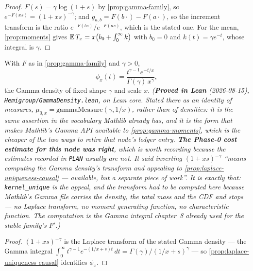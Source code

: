 \begin{proof}
\leanok
$F(s) = \gamma\log(1+s)$ by \ref{prop:gamma-family}, so $e^{-F(xs)} = (1+xs)^{-\gamma}$; and
$g_{a,b} = F(b\cdot) - F(a\cdot)$, so the increment transform is the ratio
$e^{-F(bs)}/e^{-F(as)}$, which is the stated one. For the mean, \ref{prop:moments} gives
$\mathbb{E}\,T_x = x\bigl(b_0 + \int_0^\infty k\bigr)$ with $b_0 = 0$ and $k(t) = \gamma e^{-t}$, whose
integral is $\gamma$.
\end{proof}

\begin{proposition}\label{prop:gamma-density}
\leanok
With $F$ as in \ref{prop:gamma-family} and $\gamma > 0$,
\[
  \phi_x(t) = \frac{t^{\gamma - 1} e^{-t/x}}{\Gamma(\gamma)\, x^{\gamma}},
\]
the Gamma density of fixed shape $\gamma$ and scale $x$.
\statusT\quad\emph{(\textbf{Proved in Lean} (2026-08-15), \texttt{Hemigroup/GammaDensity.lean}, on
Lean core. Stated there as an identity of \emph{measures}, $\mu_{0,x} = \mathrm{gammaMeasure}(\gamma, 1/x)$,
rather than of densities: it is the same assertion in the vocabulary Mathlib already has, and it
is the form that makes Mathlib's Gamma API available to \ref{prop:gamma-moments}, which is the
cheaper of the two ways to retire that node's ledger entry.
\textbf{The Phase-0 cost estimate for this node was right}, which is worth recording because the
estimates recorded in \texttt{PLAN} usually are not. It said inverting $(1+xs)^{-\gamma}$ ``means
computing the Gamma density's transform and appealing to \ref{prop:laplace-uniqueness-causal} ---
available, but a separate piece of work''. It is exactly that: \texttt{kernel\_unique} is the
appeal, and the transform had to be computed here because Mathlib's Gamma file carries the
density, the total mass and the CDF and stops --- no Laplace transform, no moment generating
function, no characteristic function. The computation is the Gamma integral chapter~8 already used
for the stable family's $F'$.)}
\end{proposition}

\begin{proof}
\leanok
$(1+xs)^{-\gamma}$ is the Laplace transform of the stated Gamma density --- the Gamma integral
$\int_0^\infty t^{\gamma-1}e^{-(1/x + s)t}\,dt = \Gamma(\gamma)/(1/x + s)^{\gamma}$ --- so
\ref{prop:laplace-uniqueness-causal} identifies $\phi_x$.
\end{proof}

